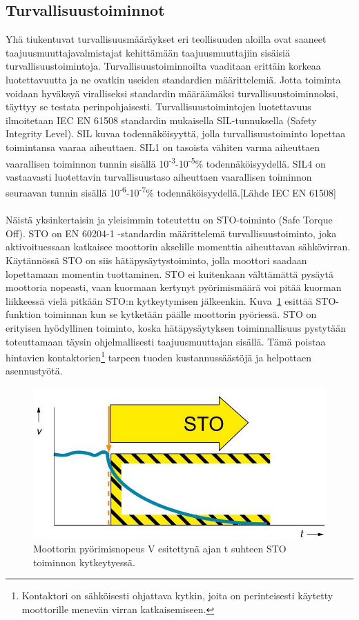 \documentclass[finnish,12pt,a4paper,pdftex,elec,utf8]{aaltothesis}
\begin{document}
\subsection{Turvallisuustoiminnot}
Yhä tiukentuvat turvallisuusmääräykset eri teollisuuden aloilla ovat saaneet taajuusmuuttajavalmistajat kehittämään taajuusmuuttajiin sisäisiä turvallisuustoimintoja. Turvallisuustoiminnoilta vaaditaan erittäin korkeaa luotettavuutta ja ne ovatkin useiden standardien määrittelemiä. Jotta toiminta voidaan hyväksyä viralliseksi standardin määräämäksi turvallisuustoiminnoksi, täyttyy se testata perinpohjaisesti. Turvallisuustoimintojen luotettavuus ilmoitetaan IEC EN 61508 standardin mukaisella SIL-tunnuksella (Safety Integrity Level). SIL kuvaa todennäköisyyttä, jolla turvallisuustoiminto lopettaa toimintansa vaaraa aiheuttaen. SIL1 on tasoista vähiten varma aiheuttaen vaarallisen toiminnon tunnin sisällä 10\textsuperscript{-3}-10\textsuperscript{-5}\% todennäköisyydellä. SIL4 on vastaavasti luotettavin turvallisuustaso aiheuttaen vaarallisen toiminnon seuraavan tunnin sisällä 10\textsuperscript{-6}-10\textsuperscript{-7}\% todennäköisyydellä.[Lähde IEC EN 61508]
\\\\
Näistä yksinkertaisin ja yleisimmin toteutettu on STO-toiminto (Safe Torque Off). STO on EN 60204-1 -standardin määrittelemä turvallisuustoiminto, joka aktivoituessaan katkaisee moottorin akselille momenttia aiheuttavan sähkövirran. Käytännössä STO on siis hätäpysäytystoiminto, jolla moottori saadaan lopettamaan momentin tuottaminen. STO ei kuitenkaan välttämättä pysäytä moottoria nopeasti, vaan kuormaan kertynyt pyörimismäärä voi pitää kuorman liikkeessä vielä pitkään STO:n kytkeytymisen jälkeenkin. Kuva~\ref{fig:STO} esittää STO-funktion toiminnan kun se kytketään päälle moottorin pyöriessä. STO on erityisen hyödyllinen toiminto, koska hätäpysäytyksen toiminnallisuus pystytään toteuttamaan täysin ohjelmallisesti taajuusmuuttajan sisällä. Tämä poistaa hintavien kontaktorien\footnote{Kontaktori on sähköisesti ohjattava kytkin, joita on perinteisesti käytetty moottorille menevän virran katkaisemiseen.} tarpeen tuoden kustannussäästöjä ja helpottaen asennustyötä.
\begin{figure}[H]
	\begin{center}
	\includegraphics[scale=0.5]{STO}
	\end{center}
	\caption{Moottorin pyörimisnopeus V esitettynä ajan t suhteen STO toiminnon kytkeytyessä.
		\cite{STOkuva}}
	\label{fig:STO}
\end{figure}
\end{document}
